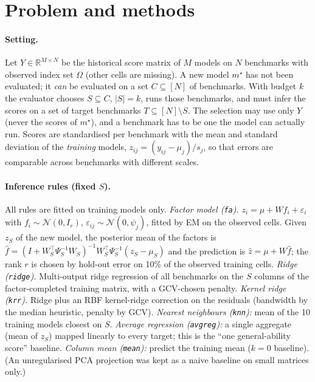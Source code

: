 \section{Problem and methods}
\label{sec:method}
\paragraph{Setting.}
Let $Y\in\mathbb{R}^{M\times N}$ be the historical score matrix of $M$ models on $N$ benchmarks with observed index set $\Omega$ (other cells are missing). A new model $m^\star$ has not been evaluated; it \emph{can} be evaluated on a set $C\subseteq[N]$ of benchmarks. With budget $k$ the evaluator chooses $S\subseteq C$, $|S|=k$, runs those benchmarks, and must infer the scores on a set of target benchmarks $T\subseteq [N]\setminus S$. The selection may use only $Y$ (never the scores of $m^\star$), and a benchmark has to be one the model can actually run. Scores are standardised per benchmark with the mean and standard deviation of the \emph{training} models, $z_{ij}=(y_{ij}-\mu_j)/s_j$, so that errors are comparable across benchmarks with different scales.

\paragraph{Inference rules (fixed $S$).}
All rules are fitted on training models only.
\emph{Factor model (\texttt{fa}).} $z_{i}=\mu+Wf_i+\varepsilon_i$ with $f_i\sim\mathcal N(0,I_r)$, $\varepsilon_{ij}\sim\mathcal N(0,\psi_j)$, fitted by EM on the observed cells. Given $z_S$ of the new model, the posterior mean of the factors is $\hat f=(I+W_S^\top\Psi_S^{-1}W_S)^{-1}W_S^\top\Psi_S^{-1}(z_S-\mu_S)$ and the prediction is $\hat z=\mu+W\hat f$; the rank $r$ is chosen by hold-out error on 10\% of the observed training cells.
\emph{Ridge (\texttt{ridge}).} Multi-output ridge regression of all benchmarks on the $S$ columns of the factor-completed training matrix, with a GCV-chosen penalty.
\emph{Kernel ridge (\texttt{krr}).} Ridge plus an RBF kernel-ridge correction on the residuals (bandwidth by the median heuristic, penalty by GCV).
\emph{Nearest neighbours (\texttt{knn}):} mean of the 10 training models closest on $S$.
\emph{Average regression (\texttt{avgreg}):} a single aggregate (mean of $z_S$) mapped linearly to every target; this is the ``one general-ability score'' baseline.
\emph{Column mean (\texttt{mean}):} predict the training mean ($k=0$ baseline).
(An unregularised PCA projection was kept as a naive baseline on small matrices only.)

